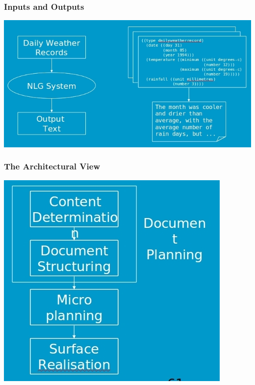 \documentclass[compress,color=usenames]{beamer}
\begin{document}
\begin{frame}
\frametitle{Inputs and Outputs}

\begin{center}
\includegraphics[scale=.3]{pics/pic6.jpg}
\end{center}

\end{frame}

\begin{frame}
\frametitle{The Architectural View}

\begin{center}
\includegraphics[scale=.3]{pics/pic7.jpg}
\end{center}
 
\end{frame}
\end{document}

